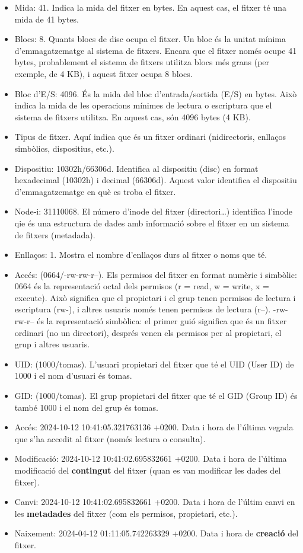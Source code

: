 \documentclass[
  12 pt,
  a4paper,
]{article}
\begin{document}
\begin{itemize}
\item
  Mida: 41. Indica la mida del fitxer en bytes. En aquest cas, el fitxer
  té una mida de 41 bytes.
\item
  Blocs: 8. Quants blocs de disc ocupa el fitxer. Un bloc és la unitat
  mínima d'emmagatzematge al sistema de fitxers. Encara que el fitxer
  només ocupe 41 bytes, probablement el sistema de fitxers utilitza
  blocs més grans (per exemple, de 4 KB), i aquest fitxer ocupa 8 blocs.
\item
  Bloc d'E/S: 4096. És la mida del bloc d'entrada/sortida (E/S) en
  bytes. Això indica la mida de les operacions mínimes de lectura o
  escriptura que el sistema de fitxers utilitza. En aquest cas, són 4096
  bytes (4 KB).
\item
  Tipus de fitxer. Aquí indica que és un fitxer ordinari (nidirectoris,
  enllaços simbòlics, dispositius, etc.).
\item
  Dispositiu: 10302h/66306d. Identifica al dispositiu (disc) en format
  hexadecimal (10302h) i decimal (66306d). Aquest valor identifica el
  dispositiu d'emmagatzematge en què es troba el fitxer.
\item
  Node‐i: 31110068. El número d'inode del fitxer (directori\ldots)
  identifica l'inode qie és una estructura de dades amb informació sobre
  el fitxer en un sistema de fitxers (metadada).
\item
  Enllaços: 1. Mostra el nombre d'enllaços durs al fitxer o noms que té.
\item
  Accés: (0664/-rw-rw-r--). Els permisos del fitxer en format numèric i
  simbòlic: 0664 és la representació octal dels permisos (r = read, w =
  write, x = execute). Això significa que el propietari i el grup tenen
  permisos de lectura i escriptura (rw-), i altres usuaris només tenen
  permisos de lectura (r--). -rw-rw-r-- és la representació simbòlica:
  el primer guió significa que és un fitxer ordinari (no un directori),
  després venen els permisos per al propietari, el grup i altres
  usuaris.
\item
  UID: (1000/tomas). L'usuari propietari del fitxer que té el UID (User
  ID) de 1000 i el nom d'usuari és tomas.
\item
  GID: (1000/tomas). El grup propietari del fitxer que té el GID (Group
  ID) és també 1000 i el nom del grup és tomas.
\item
  Accés: 2024-10-12 10:41:05.321763136 +0200. Data i hora de l'última
  vegada que s'ha accedit al fitxer (només lectura o consulta).
\item
  Modificació: 2024-10-12 10:41:02.695832661 +0200. Data i hora de
  l'última modificació del \textbf{contingut} del fitxer (quan es van
  modificar les dades del fitxer).
\item
  Canvi: 2024-10-12 10:41:02.695832661 +0200. Data i hora de l'últim
  canvi en les \textbf{metadades} del fitxer (com els permisos,
  propietari, etc.).
\item
  Naixement: 2024-04-12 01:11:05.742263329 +0200. Data i hora de
  \textbf{creació} del fitxer.
\end{itemize}
\end{document}
